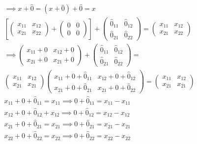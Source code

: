 \begin{exercise}
	\begin{align*}
		 & \implies x+\hat{0}=(x+\bar{0})+\hat{0}=x                                                                \\
		 & \left[\begin{pmatrix}
				         x_{11} & x_{12} \\ x_{21}&x_{22}
			         \end{pmatrix}+\begin{pmatrix}
				                       0 & 0 \\0&0
			                       \end{pmatrix}\right]+\begin{pmatrix}
			                                            \hat{0}_{11} & \hat{0}_{12} \\ \hat{0}_{21}&\hat{0}_{22}
		                                            \end{pmatrix}=\begin{pmatrix}
			                                                          x_{11} & x_{12} \\x_{21}&x_{22}
		                                                          \end{pmatrix}        \\
		 & \implies \begin{pmatrix}
			            x_{11}+0 & x_{12}+0 \\x_{21}+0&x_{21}+0
		            \end{pmatrix}+\begin{pmatrix}
			                          \hat{0}_{11} & \hat{0}_{12} \\ \hat{0}_{21}&\hat{0}_{22}
		                          \end{pmatrix}=                          \\
		 & \begin{pmatrix}
			   x_{11} & x_{12} \\x_{21}&x_{21}
		   \end{pmatrix}\begin{pmatrix}
			                x_{11}+0+\hat{0}_{11} & x_{12}+0+\hat{0}_{12} \\x_{21}+0+\hat{0}_{21}&x_{21}+0+\hat{0}_{22}
		                \end{pmatrix}=\begin{pmatrix}
			                              x_{11} & x_{12} \\x_{21}&x_{21}
		                              \end{pmatrix} \\
		 & x_{11}+0+\hat{0}_{11}=x_{11}\implies 0+\hat{0}_{11}=x_{11}-x_{11}                                       \\
		 & x_{12}+0+\hat{0}_{12}+x_{12}\implies 0+\hat{0}_{12}=x_{12}-x_{12}                                       \\
		 & x_{21}+0+\hat{0}_{21}=x_{21}\implies 0+\hat{0}_{21}=x_{21}-x_{21}                                       \\
		 & x_{22}+0+\hat{0}_{22}=x_{22}\implies 0+\hat{0}_{22}=x_{22}-x_{22}
	\end{align*}
\end{exercise}

